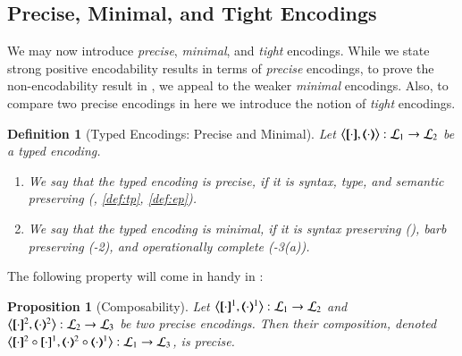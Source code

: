 \documentclass[preprint,11pt]{elsarticle}
\newtheorem{definition}{Definition}[section]
\newtheorem{proposition}{Proposition}[section]
\begin{document}
{\subsection{Precise, Minimal, and Tight Encodings}
We may now introduce 
\emph{precise}, \emph{minimal}, and \emph{tight}
 encodings.
While we state strong positive encodability results %
in terms of {\em precise} encodings,
to prove the non-encodability result in , 
we appeal to the weaker {\em minimal} encodings.  
Also, to compare two precise encodings in  here we introduce the notion of \emph{tight} encodings.

\begin{definition}[Typed Encodings: Precise and Minimal]%
\label{def:goodenc}
Let $\enco{\map{\cdot}, \mapt{\cdot}}: \tyl{L}_1 \to \tyl{L}_2$ be a typed encoding.
\begin{enumerate}[-]
\item We say that 
	the typed encoding 
	 is 
	\emph{precise}, if it is syntax, type, and semantic preserving (, \ref{def:tp}, \ref{def:ep}).
	\item 
	We say that the typed encoding is
	\emph{minimal}, if it is syntax preserving 
	(),
	barb preserving (-2), 
	and operationally complete (-3(a)).
	\end{enumerate}
\end{definition}




The following property will come in handy in :

\begin{proposition}[Composability]%
	\label{pro:composition}
	Let %
	$\enco{\map{\cdot}^{1}, \mapt{\cdot}^{1}%
	}: \tyl{L}_1 \to \tyl{L}_2$
	and 
	$\enco{\map{\cdot}^{2}, \mapt{\cdot}^{2}%
	}: \tyl{L}_2 \to \tyl{L}_3$
	be two precise %
	encodings.
	Then their composition, denoted 
	$\enco{\map{\cdot}^{2} \circ \map{\cdot}^{1}, \mapt{\cdot}^{2} \circ \mapt{\cdot}^{1} %
	}: \tyl{L}_1 \to \tyl{L}_3$,
	is precise. 
\end{proposition}

}
\end{document}
